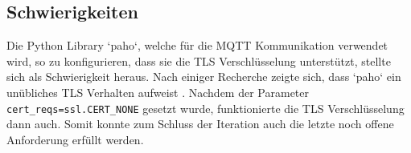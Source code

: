 \subsection{Schwierigkeiten}
Die Python Library `paho`, welche für die \ac{MQTT} Kommunikation verwendet wird, so zu konfigurieren,
dass sie die \ac{TLS} Verschlüsselung unterstützt, stellte sich als Schwierigkeit heraus.
Nach einiger Recherche zeigte sich, dass `paho` ein unübliches \ac{TLS}
Verhalten aufweist \parencite{eclipse_paho_ssl_2019}.
Nachdem der Parameter \texttt{cert\_reqs=ssl.CERT\_NONE} gesetzt wurde, funktionierte
die \ac{TLS} Verschlüsselung dann auch.
Somit konnte zum Schluss der Iteration auch die letzte noch offene Anforderung erfüllt werden.